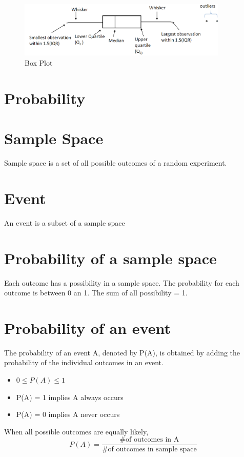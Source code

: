 \documentclass{article}
\begin{document}
    \begin{figure}[H]
        \centering
        \includegraphics[width=10cm]{figures/box_plot.PNG}
        \caption{Box Plot}
        \label{fig:box_plot}
    \end{figure}

    \section{Probability}
    \section*{Sample Space}
    Sample space is a set of all possible outcomes of a random experiment.

    \section*{Event}
    An event is a subset of a sample space

    \section*{Probability of a sample space}
    Each outcome has a possibility in a sample space. The probability for each outcome is between 0 an 1.
    The sum of all possibility = 1.

    \section*{Probability of an event}
    The probability of an event A, denoted by P(A), is obtained by adding the probability of 
    the individual outcomes in an event.
    \begin{itemize}
        \item  $0\leq P(A) \leq 1$
        \item P(A) = 1 implies A always occurs
        \item P(A) = 0 implies A never occurs
    \end{itemize}
    When all possible outcomes are equally likely,
        \begin{equation*}
            P(A) = \frac{\text{\# of outcomes in A}}{\text{\# of outcomes in sample space}}
        \end{equation*}
\end{document}
